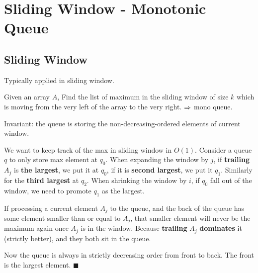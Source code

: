 \section{Sliding Window - Monotonic Queue}\label{monoqueue}
\subsection{Sliding Window}
Typically applied in sliding window. 

 Given an array $A$, Find the list of maximum in the sliding window of size $k$ which is moving from the very left of the array to the very right. $\Rightarrow$ mono queue.

Invariant: the queue is storing the non-decreasing-ordered elements of current window.

We want to keep track of the max in sliding window  in $O(1)$. Consider a queue $q$ to only store max element at $q_0$. When expanding the window by $j$, if \textbf{trailing} $A_j$ is \textbf{the largest}, we put it at $q_0$, if it is \textbf{second largest}, we put it $q_1$. Similarly for the \textbf{third largest} at $q_2$.  When shrinking the window by $i$, if $q_0$ fall out of the window, we need to promote $q_1$ as the largest. 

If processing a current element $A_j$ to the queue, and the back of the queue has some element smaller than or equal to $A_j$, that smaller element will never be the maximum again once $A_j$ is in the window. Because \textbf{trailing} $A_j$ \textbf{dominates} it (strictly better), and they both sit in the queue.

Now the queue is always in strictly decreasing order from front to back. The front is the largest element. $\blacksquare$

